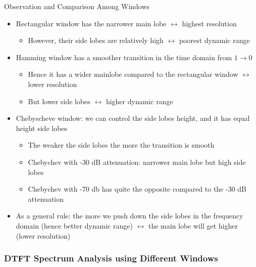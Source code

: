 \begin{frame}[t,allowframebreaks]{Observation and Comparison Among Windows}

\begin{itemize}

\item Rectangular window has the narrower main lobe $\leftrightarrow$ highest resolution

	\begin{itemize}
	\item However, their side lobes are relatively high $\leftrightarrow$ poorest dynamic range
	\end{itemize}

\item Hamming window has a smoother transition in the time domain from $1 \rightarrow 0$

	\begin{itemize}
	\item Hence it has a wider mainlobe compared to the rectangular window $\leftrightarrow$ lower resolution
	
	\item But lower side lobes $\leftrightarrow$ higher dynamic range
	\end{itemize}

\newpage
\item Chebyscheve window: we can control the side lobes height, and it has equal height side lobes

	\begin{itemize}
	\item The weaker the side lobes the more the transition is smooth
	
	\item Chebychev with -30 dB attenuation: narrower main lobe but high side lobes
	
	\item Chebychev with -70 db has quite the opposite compared to the -30 dB attenuation
	\end{itemize}

\item As a general rule: the more we push down the side lobes in the frequency domain (hence better dynamic range) $\leftrightarrow$ the main lobe will get higher (lower resolution)

\end{itemize}

\end{frame}


\subsubsection{DTFT Spectrum Analysis using Different Windows}


